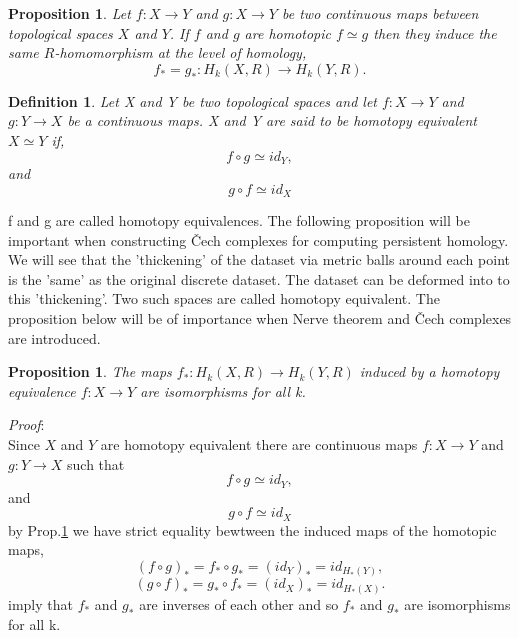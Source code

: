 \documentclass{article}
\newcommand{\be}{\begin{equation}}
\newcommand{\ee}{\end{equation}}
\newtheorem{definition}[theorem]{Definition}
\newtheorem{proposition}[theorem]{Proposition}
\begin{document}
\begin{proposition}\label{homotopic maps induced} Let $f:X\to Y$ and $g:X\to Y$ be two continuous maps between topological spaces $X$ and $Y$. If $f$ and $g$ are homotopic $f \simeq g$ then they induce the same $R$-homomorphism at the level of homology,
\be
f_{*} = g_{*}: H_{k}(X,R) \to H_{k}(Y,R).
\ee
\end{proposition}


\begin{definition} Let X and Y be two topological spaces and let $f: X \to Y$ and $g: Y \to X$  be a continuous maps. X and Y are said to be homotopy equivalent $X \simeq Y$ if,
\be
f \circ g \simeq id_{Y},
\ee and
\be
g \circ f \simeq id_{X}
\ee
\end{definition}
f and g are called homotopy equivalences. The following proposition will be important when constructing \v{C}ech complexes for computing persistent homology. We will see that the 'thickening' of the dataset via metric balls around each point is the 'same' as the original discrete dataset. The dataset can be deformed into to this 'thickening'. Two such spaces are called homotopy equivalent. The proposition below will be of importance when Nerve theorem and \v{C}ech complexes are introduced.
\begin{proposition}\label{induced homotopy equivalence} The maps $f_{*}: H_{k}(X,R) \to H_{k}(Y,R)$ induced by a homotopy equivalence $f:X \to Y$ are isomorphisms for all k.
\end{proposition}
\textit{Proof}:\\ Since $X$ and $Y$ are homotopy equivalent there are continuous maps $f:X \to Y$ and $g:Y \to X$ such that 
\be
f \circ g \simeq id_{Y},
\ee and
\be
g \circ f \simeq id_{X}
\ee by Prop.\ref{homotopic maps induced} we have strict equality bewtween the induced maps of the homotopic maps,
\be
(f \circ g)_{*} = f_{*} \circ g_{*} = (id_Y)_{*} = id_{H_{*}(Y)},
\ee
\be
(g \circ f)_{*} = g_{*} \circ f_{*} = (id_X)_{*} = id_{H_{*}(X)}.
\ee
imply that $f_{*}$ and $g_{*}$ are inverses of each other and so $f_{*}$ and $g_{*}$ are isomorphisms for all k.
\end{document}
